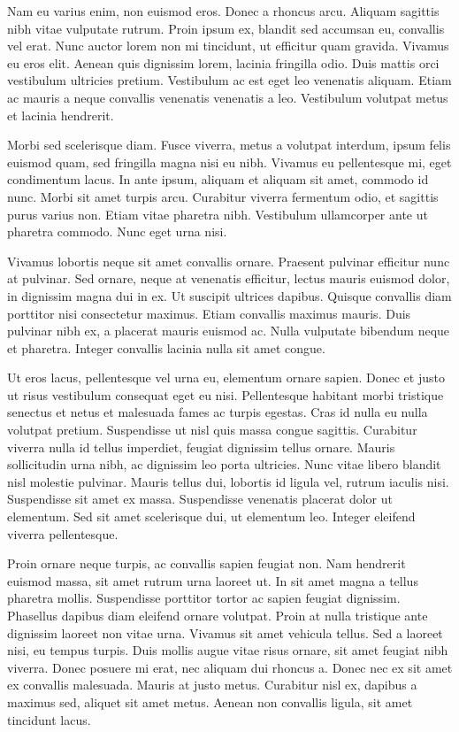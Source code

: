 Nam eu varius enim, non euismod eros. Donec a rhoncus arcu. Aliquam sagittis nibh vitae vulputate rutrum. Proin ipsum ex, blandit sed accumsan eu, convallis vel erat. Nunc auctor lorem non mi tincidunt, ut efficitur quam gravida. Vivamus eu eros elit. Aenean quis dignissim lorem, lacinia fringilla odio. Duis mattis orci vestibulum ultricies pretium. Vestibulum ac est eget leo venenatis aliquam. Etiam ac mauris a neque convallis venenatis venenatis a leo. Vestibulum volutpat metus et lacinia hendrerit.

Morbi sed scelerisque diam. Fusce viverra, metus a volutpat interdum, ipsum felis euismod quam, sed fringilla magna nisi eu nibh. Vivamus eu pellentesque mi, eget condimentum lacus. In ante ipsum, aliquam et aliquam sit amet, commodo id nunc. Morbi sit amet turpis arcu. Curabitur viverra fermentum odio, et sagittis purus varius non. Etiam vitae pharetra nibh. Vestibulum ullamcorper ante ut pharetra commodo. Nunc eget urna nisi.

Vivamus lobortis neque sit amet convallis ornare. Praesent pulvinar efficitur nunc at pulvinar. Sed ornare, neque at venenatis efficitur, lectus mauris euismod dolor, in dignissim magna dui in ex. Ut suscipit ultrices dapibus. Quisque convallis diam porttitor nisi consectetur maximus. Etiam convallis maximus mauris. Duis pulvinar nibh ex, a placerat mauris euismod ac. Nulla vulputate bibendum neque et pharetra. Integer convallis lacinia nulla sit amet congue.

Ut eros lacus, pellentesque vel urna eu, elementum ornare sapien. Donec et justo ut risus vestibulum consequat eget eu nisi. Pellentesque habitant morbi tristique senectus et netus et malesuada fames ac turpis egestas. Cras id nulla eu nulla volutpat pretium. Suspendisse ut nisl quis massa congue sagittis. Curabitur viverra nulla id tellus imperdiet, feugiat dignissim tellus ornare. Mauris sollicitudin urna nibh, ac dignissim leo porta ultricies. Nunc vitae libero blandit nisl molestie pulvinar. Mauris tellus dui, lobortis id ligula vel, rutrum iaculis nisi. Suspendisse sit amet ex massa. Suspendisse venenatis placerat dolor ut elementum. Sed sit amet scelerisque dui, ut elementum leo. Integer eleifend viverra pellentesque.

Proin ornare neque turpis, ac convallis sapien feugiat non. Nam hendrerit euismod massa, sit amet rutrum urna laoreet ut. In sit amet magna a tellus pharetra mollis. Suspendisse porttitor tortor ac sapien feugiat dignissim. Phasellus dapibus diam eleifend ornare volutpat. Proin at nulla tristique ante dignissim laoreet non vitae urna. Vivamus sit amet vehicula tellus. Sed a laoreet nisi, eu tempus turpis. Duis mollis augue vitae risus ornare, sit amet feugiat nibh viverra. Donec posuere mi erat, nec aliquam dui rhoncus a. Donec nec ex sit amet ex convallis malesuada. Mauris at justo metus. Curabitur nisl ex, dapibus a maximus sed, aliquet sit amet metus. Aenean non convallis ligula, sit amet tincidunt lacus.

